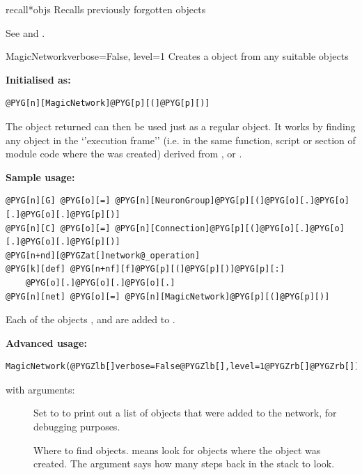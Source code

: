 \documentclass[letterpaper,10pt,english]{manual}
\begin{document}
\hypertarget{brian.recall}{}\begin{funcdesc}{recall}{*objs}
Recalls previously forgotten objects

See \hyperlink{brian.forget}{} and \hyperlink{brian.clear}{}.
\end{funcdesc}

\hypertarget{brian.MagicNetwork}{}\begin{classdesc}{MagicNetwork}{verbose=False, level=1}
Creates a \hyperlink{brian.Network}{} object from any suitable objects

\textbf{Initialised as:}

\begin{Verbatim}[commandchars=@\[\]]
@PYG[n][MagicNetwork]@PYG[p][(]@PYG[p][)]
\end{Verbatim}

The object returned can then be used just as a regular
\hyperlink{brian.Network}{} object. It works by finding any object in
the `'execution frame'' (i.e. in the same function, script
or section of module code where the \hyperlink{brian.MagicNetwork}{} was
created) derived from \hyperlink{brian.NeuronGroup}{}, \hyperlink{brian.Connection}{} or
\hyperlink{brian.NetworkOperation}{}.

\textbf{Sample usage:}

\begin{Verbatim}[commandchars=@\[\]]
@PYG[n][G] @PYG[o][=] @PYG[n][NeuronGroup]@PYG[p][(]@PYG[o][.]@PYG[o][.]@PYG[o][.]@PYG[p][)]
@PYG[n][C] @PYG[o][=] @PYG[n][Connection]@PYG[p][(]@PYG[o][.]@PYG[o][.]@PYG[o][.]@PYG[p][)]
@PYG[n+nd][@PYGZat[]network@_operation]
@PYG[k][def] @PYG[n+nf][f]@PYG[p][(]@PYG[p][)]@PYG[p][:]
    @PYG[o][.]@PYG[o][.]@PYG[o][.]
@PYG[n][net] @PYG[o][=] @PYG[n][MagicNetwork]@PYG[p][(]@PYG[p][)]
\end{Verbatim}

Each of the objects ,  and  are added to .

\textbf{Advanced usage:}

\begin{Verbatim}[commandchars=@\[\]]
MagicNetwork(@PYGZlb[]verbose=False@PYGZlb[],level=1@PYGZrb[]@PYGZrb[])
\end{Verbatim}

with arguments:
\begin{description}
\item[] \leavevmode
Set to  to print out a list of objects that were
added to the network, for debugging purposes.

\item[] \leavevmode
Where to find objects.  means look for objects
where the \hyperlink{brian.MagicNetwork}{} object was created. The 
argument says how many steps back in the stack to look.

\end{description}
\end{classdesc}
\end{document}
